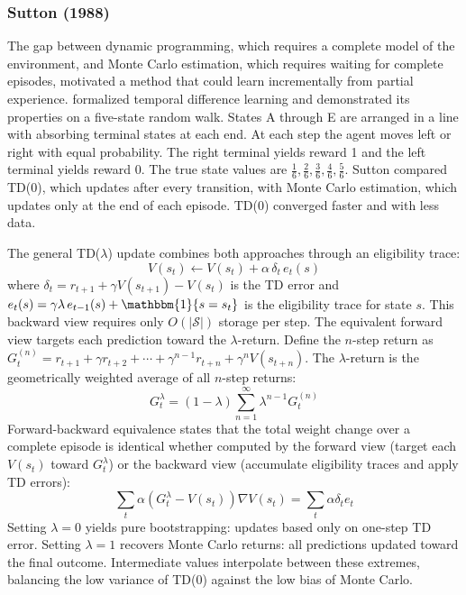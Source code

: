 \subsubsection{Sutton (1988)}

The gap between dynamic programming, which requires a complete model of the environment, and Monte Carlo estimation, which requires waiting for complete episodes, motivated a method that could learn incrementally from partial experience. \citet{sutton1988} formalized temporal difference learning and demonstrated its properties on a five-state random walk. States A through E are arranged in a line with absorbing terminal states at each end. At each step the agent moves left or right with equal probability. The right terminal yields reward 1 and the left terminal yields reward 0. The true state values are $\frac{1}{6}, \frac{2}{6}, \frac{3}{6}, \frac{4}{6}, \frac{5}{6}$. Sutton compared TD(0), which updates after every transition, with Monte Carlo estimation, which updates only at the end of each episode. TD(0) converged faster and with less data.

The general TD($\lambda$) update combines both approaches through an eligibility trace:
\begin{equation}
V(s_t) \leftarrow V(s_t) + \alpha \, \delta_t \, e_t(s)
\end{equation}
where $\delta_t = r_{t+1} + \gamma V(s_{t+1}) - V(s_t)$ is the TD error and $e_t(s) = \gamma \lambda \, e_{t-1}(s) + \mathbbm{1}\{s = s_t\}$ is the eligibility trace for state $s$. This backward view requires only $O(|\mathcal{S}|)$ storage per step. The equivalent forward view targets each prediction toward the $\lambda$-return. Define the $n$-step return as $G_t^{(n)} = r_{t+1} + \gamma r_{t+2} + \cdots + \gamma^{n-1} r_{t+n} + \gamma^n V(s_{t+n})$. The $\lambda$-return is the geometrically weighted average of all $n$-step returns:
\begin{equation}
G_t^\lambda = (1-\lambda) \sum_{n=1}^{\infty} \lambda^{n-1} G_t^{(n)}
\end{equation}
Forward-backward equivalence states that the total weight change over a complete episode is identical whether computed by the forward view (target each $V(s_t)$ toward $G_t^\lambda$) or the backward view (accumulate eligibility traces and apply TD errors):
\begin{equation}
\sum_{t} \alpha (G_t^\lambda - V(s_t)) \nabla V(s_t) = \sum_{t} \alpha \delta_t e_t
\end{equation}
Setting $\lambda = 0$ yields pure bootstrapping: updates based only on one-step TD error. Setting $\lambda = 1$ recovers Monte Carlo returns: all predictions updated toward the final outcome. Intermediate values interpolate between these extremes, balancing the low variance of TD(0) against the low bias of Monte Carlo.

